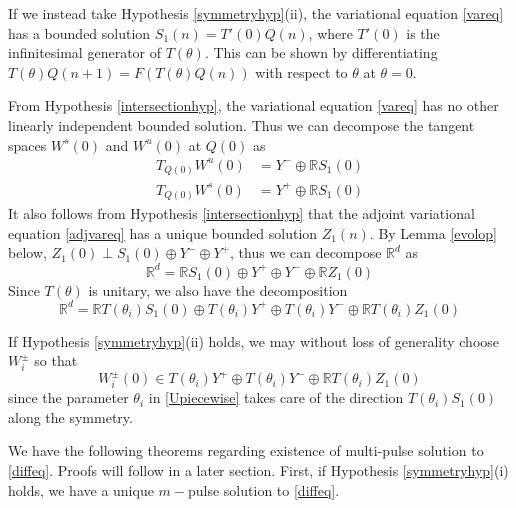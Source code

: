 \documentclass[12pt]{article}
\def\R{{\mathbb R}}
\begin{document}
If we instead take Hypothesis \ref{symmetryhyp}(ii), the variational equation \eqref{vareq} has a bounded solution $S_1(n) = T'(0) Q(n)$, where $T'(0)$ is the infinitesimal generator of $T(\theta)$. This can be shown by differentiating $T(\theta) Q(n+1) = F(T(\theta)Q(n))$ with respect to $\theta$ at $\theta = 0$.

From Hypothesis \ref{intersectionhyp}, the variational equation \eqref{vareq} has no other linearly independent bounded solution. Thus we can decompose the tangent spaces $W^s(0)$ and $W^u(0)$ at $Q(0)$ as
\begin{align*}
T_{Q(0)} W^u(0) &= Y^- \oplus \R S_1(0) \\
T_{Q(0)} W^s(0) &= Y^+ \oplus \R S_1(0)
\end{align*}
It also follows from Hypothesis \ref{intersectionhyp} that the adjoint variational equation \eqref{adjvareq} has a unique bounded solution $Z_1(n)$. By Lemma \ref{evolop} below, $Z_1(0) \perp S_1(0) \oplus Y^- \oplus Y^+$, thus we can decompose $\R^d$ as
\begin{equation}\label{nontdecomp}
\R^d = \R S_1(0) \oplus Y^+ \oplus Y^- \oplus \R Z_1(0)
\end{equation}
Since $T(\theta)$ is unitary, we also have the decomposition
\begin{equation}\label{nontdecompT}
\R^d = \R T(\theta_i) S_1(0) \oplus T(\theta_i) Y^+ \oplus T(\theta_i) Y^- \oplus \R T(\theta_i) Z_1(0)
\end{equation}

If Hypothesis \ref{symmetryhyp}(ii) holds, we may without loss of generality choose $W_i^\pm$ so that 
\begin{equation}\label{W0loc}
W_i^\pm(0) \in T(\theta_i) Y^+ \oplus T(\theta_i) Y^- \oplus \R T(\theta_i) Z_1(0)
\end{equation}
since the parameter $\theta_i$ in \eqref{Upiecewise} takes care of the direction $T(\theta_i) S_1(0)$ along the symmetry.

We have the following theorems regarding existence of multi-pulse solution to \eqref{diffeq}. Proofs will follow in a later section. First, if Hypothesis \ref{symmetryhyp}(i) holds, we have a unique $m-$pulse solution to \eqref{diffeq}.
\end{document}
